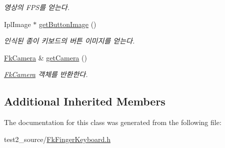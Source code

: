 \begin{DoxyCompactItemize}
\begin{DoxyCompactList}\small\item\em 영상의 F\+P\+S를 얻는다. \end{DoxyCompactList}\item 
\hypertarget{class_fk_finger_keyboard_aad9fc01fbff5408d5ce959ea12545933}{}Ipl\+Image $\ast$ \hyperlink{class_fk_finger_keyboard_aad9fc01fbff5408d5ce959ea12545933}{get\+Button\+Image} ()\label{class_fk_finger_keyboard_aad9fc01fbff5408d5ce959ea12545933}

\begin{DoxyCompactList}\small\item\em 인식된 종이 키보드의 버튼 이미지를 얻는다. \end{DoxyCompactList}\item 
\hypertarget{class_fk_finger_keyboard_aac9aef44e5162e3c15f8b373530f0fd5}{}\hyperlink{class_fk_camera}{Fk\+Camera} \& \hyperlink{class_fk_finger_keyboard_aac9aef44e5162e3c15f8b373530f0fd5}{get\+Camera} ()\label{class_fk_finger_keyboard_aac9aef44e5162e3c15f8b373530f0fd5}

\begin{DoxyCompactList}\small\item\em \hyperlink{class_fk_camera}{Fk\+Camera} 객체를 반환한다. \end{DoxyCompactList}\end{DoxyCompactItemize}
\subsection*{Additional Inherited Members}


The documentation for this class was generated from the following file\+:\begin{DoxyCompactItemize}
\item 
test2\+\_\+source/\hyperlink{_fk_finger_keyboard_8h}{Fk\+Finger\+Keyboard.\+h}\end{DoxyCompactItemize}
